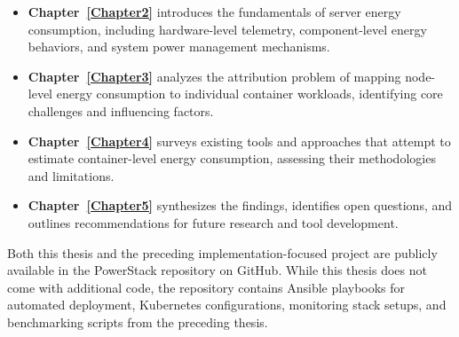 \begin{itemize}
\item \textbf{Chapter~\ref{Chapter2}} introduces the fundamentals of server energy consumption, including hardware-level telemetry, component-level energy behaviors, and system power management mechanisms.
\item \textbf{Chapter~\ref{Chapter3}} analyzes the attribution problem of mapping node-level energy consumption to individual container workloads, identifying core challenges and influencing factors.
\item \textbf{Chapter~\ref{Chapter4}} surveys existing tools and approaches that attempt to estimate container-level energy consumption, assessing their methodologies and limitations.
\item \textbf{Chapter~\ref{Chapter5}} synthesizes the findings, identifies open questions, and outlines recommendations for future research and tool development.
\end{itemize}

Both this thesis and the preceding implementation-focused project are publicly available in the PowerStack\parencite{PowerStack} repository on GitHub. While this thesis does not come with additional code, the repository contains Ansible playbooks for automated deployment, Kubernetes configurations, monitoring stack setups, and benchmarking scripts from the preceding thesis.
